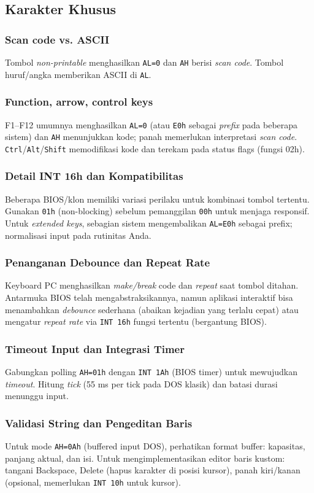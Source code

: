 \subsection{Karakter Khusus}
\subsubsection{Scan code vs. ASCII}
Tombol \textit{non-printable} menghasilkan \texttt{AL=0} dan \texttt{AH} berisi \textit{scan code}. Tombol huruf/angka memberikan ASCII di \texttt{AL}.

\subsubsection{Function, arrow, control keys}
F1--F12 umumnya menghasilkan \texttt{AL=0} (atau \texttt{E0h} sebagai \textit{prefix} pada beberapa sistem) dan \texttt{AH} menunjukkan kode; panah memerlukan interpretasi \textit{scan code}. \texttt{Ctrl}/\texttt{Alt}/\texttt{Shift} memodifikasi kode dan terekam pada status flags (fungsi 02h).

\subsubsection{Detail INT 16h dan Kompatibilitas}
Beberapa BIOS/klon memiliki variasi perilaku untuk kombinasi tombol tertentu. Gunakan \texttt{01h} (non-blocking) sebelum pemanggilan \texttt{00h} untuk menjaga responsif. Untuk \textit{extended keys}, sebagian sistem mengembalikan \texttt{AL=E0h} sebagai prefix; normalisasi input pada rutinitas Anda. 
\subsubsection{Penanganan Debounce dan Repeat Rate}
Keyboard PC menghasilkan \textit{make/break} code dan \textit{repeat} saat tombol ditahan. Antarmuka BIOS telah mengabstraksikannya, namun aplikasi interaktif bisa menambahkan \textit{debounce} sederhana (abaikan kejadian yang terlalu cepat) atau mengatur \textit{repeat rate} via \texttt{INT 16h} fungsi tertentu (bergantung BIOS). 
\subsubsection{Timeout Input dan Integrasi Timer}
Gabungkan polling \texttt{AH=01h} dengan \texttt{INT 1Ah} (BIOS timer) untuk mewujudkan \textit{timeout}. Hitung \textit{tick} (55 ms per tick pada DOS klasik) dan batasi durasi menunggu input. 
\subsubsection{Validasi String dan Pengeditan Baris}
Untuk mode \texttt{AH=0Ah} (buffered input DOS), perhatikan format buffer: kapasitas, panjang aktual, dan isi. Untuk mengimplementasikan editor baris kustom: tangani Backspace, Delete (hapus karakter di posisi kursor), panah kiri/kanan (opsional, memerlukan \texttt{INT 10h} untuk kursor). 

